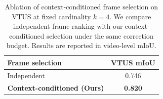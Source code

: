 \begin{table}[t]
\centering
\caption{Ablation of context-conditioned frame selection
on VTUS at fixed cardinality $k=4$.
We compare independent frame ranking with our
context-conditioned selection under the same correction budget.
Results are reported in video-level mIoU.}
\label{tab:vtus_frame_selection_ablation}
\small
\begin{tabular}{@{}lc@{}}
\toprule
\textbf{Frame selection} & \textbf{VTUS mIoU} \\
\midrule
Independent & 0.746 \\
\textbf{Context-conditioned (Ours)} & \textbf{0.820} \\
\bottomrule
\end{tabular}
\end{table}
